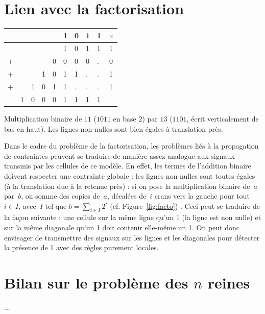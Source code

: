 
\section{Lien avec la factorisation}

\begin{floatingfigure}[r]{.5\textwidth}
\centering
\begin{tabular}{lllllllll|c}
&&&&&1&0&1&1&$\times$\\
\hline
&&&&&1&0&1&1&1\\
+&&&&0&0&0&0&.&0 \\
+&&&1&0&1&1&.&.&1\\
+&&1&0&1&1&.&.&.&1\\
\hline
&1&0&0&0&1&1&1&1&\\
\end{tabular}
\caption{Multiplication binaire de $11$ ($1011$ en base 2) par $13$ ($1101$, écrit verticalement de bas en haut). Les lignes non-nulles sont bien égales à translation près.}
\label{fig:facto}
\end{floatingfigure}
Dans le cadre du problème de la factorisation, les problèmes liés à la propagation de con\-train\-tes peuvent se traduire de manière assez analogue aux signaux transmis par les cellules de ce modèle. En effet, les termes de l'addition binaire doivent respecter une contrainte globale : les lignes non-nulles sont toutes égales (à la translation due à la retenue près) : si on pose la multiplication binaire de~$a$ par~$b$, on somme des copies de~$a$, décalées de~$i$ crans vers la gauche pour tout $i\in I$, avec~$I$ tel que $b = \sum_{i\in I}2^i$ (cf. Figure~\ref{fig:facto}) . Ceci peut se traduire de la façon suivante : une cellule sur la même ligne qu'un 1 (la ligne est non nulle) et sur la même diagonale qu'un 1 doit contenir elle-même un 1. On peut donc envisager de transmettre des signaux sur les lignes et les diagonales pour détecter la présence de 1 avec des règles purement locales.
\\

\section*{Bilan sur le problème des $n$ reines}

...

